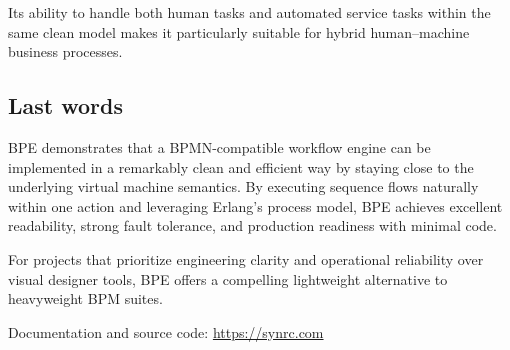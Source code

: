\documentclass[11pt,a4paper]{article}
\begin{document}
Its ability to handle both human tasks and automated service tasks within the same clean model
makes it particularly suitable for hybrid human–machine business processes.

\subsection{Last words}

BPE demonstrates that a BPMN-compatible workflow engine can be implemented in a remarkably clean
and efficient way by staying close to the underlying virtual machine semantics.
By executing sequence flows naturally within one action and leveraging Erlang’s process model,
BPE achieves excellent readability, strong fault tolerance, and production readiness with minimal code.

For projects that prioritize engineering clarity and operational reliability over visual designer tools,
BPE offers a compelling lightweight alternative to heavyweight BPM suites.

\bigskip
\noindent Documentation and source code: \url{https://synrc.com}
\end{document}
